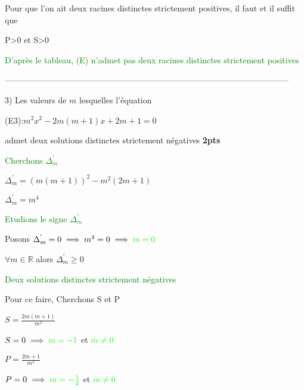 \documentclass[12pt]{article}
\begin{document}
Pour que l'on ait deux racines distinctes strictement positives, il faut et il suffit que

 P>0 et S>0

\textcolor{green}{D'après le tableau, (E) n'admet pas deux racines distinctes strictement positives}

------------------------------------------------------------------------------------------------------

3) Les valeurs de \( m \) lesquelles l'équation
 
(E3):\( m^{2}x^2 - 2m(m + 1)x + 2m + 1 = 0 \) 

admet deux solutions distinctes strictement négatives  \textbf{2pts}

\textcolor{green}{Cherchons $\Delta_{m}^{'}$}

$\Delta_{m}^{'}=(m(m+1))^{2}-m^{2}(2m + 1)$

$\Delta_{m}^{'}=m^{4}$

\textcolor{green}{Etudions le signe $\Delta_{m}^{'}$}

Posons $\Delta_{m}^{'}=0\implies m^{4}=0\implies \textcolor{green}{m=0}$

$\forall m\in \mathbb{R} $ alors $\Delta_{m}^{'}\geq 0$

\textcolor{green}{Deux solutions distinctes strictement négatives }

Pour ce faire, Cherchons S et P

$S=\frac{2m(m + 1)}{m^{2}}$

$S=0\implies \textcolor{green}{m=-1}$ et $\textcolor{green}{m\neq 0}$

$P=\frac{2m + 1}{m^{2}}$

$P=0\implies \textcolor{green}{m = -\frac{1}{2}}$ et $\textcolor{green}{m\neq 0}$
\end{document}
